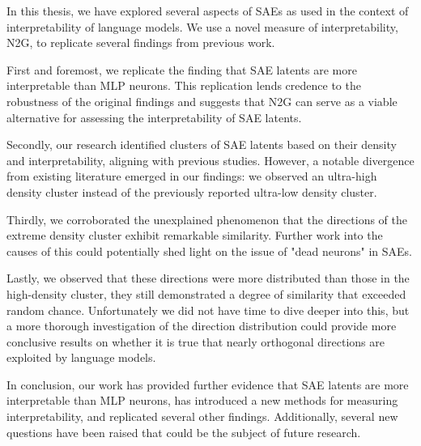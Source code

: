 In this thesis, we have explored several aspects of \acp{SAE} as used in the context of interpretability of language models.
We use a novel measure of interpretability, \ac{N2G}, to replicate several findings from previous work.

First and foremost, we replicate the finding that \ac{SAE} latents are more interpretable than \ac{MLP} neurons.
This replication lends credence to the robustness of the original findings and suggests that \ac{N2G} can serve as a viable alternative for assessing the interpretability of \ac{SAE} latents.

Secondly, our research identified clusters of \ac{SAE} latents based on their density and interpretability, aligning with previous studies.
However, a notable divergence from existing literature emerged in our findings: we observed an ultra-high density cluster instead of the previously reported ultra-low density cluster. 

Thirdly, we corroborated the unexplained phenomenon that the directions of the extreme density cluster exhibit remarkable similarity.
Further work into the causes of this could potentially shed light on the issue of "dead neurons" in \acp{SAE}.

Lastly, we observed that these directions were more distributed than those in the high-density cluster, they still demonstrated a degree of similarity that exceeded random chance.
Unfortunately we did not have time to dive deeper into this, but a more thorough investigation of the direction distribution could provide more conclusive results on whether it is true that nearly orthogonal directions are exploited by language models.

In conclusion, our work has provided further evidence that \ac{SAE} latents are more interpretable than \ac{MLP} neurons, has introduced a new methods for measuring interpretability, and replicated several other findings.
Additionally, several new questions have been raised that could be the subject of future research.
